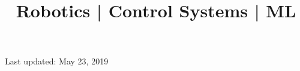 \documentclass[10pt,a4paper]{moderncv}
\title{Robotics | Control Systems  | ML
	\newline
	\bf{\lb{\footnotesize
			Rerum Cognoscere Causas: To know the causes of things.} }}
\begin{document}
	\makecvtitle
	
	
	
	
	
	
	
	
	
	
	
%
	\footnotesize \centering Last updated: May 23, 2019
\clearpage
\end{document}
